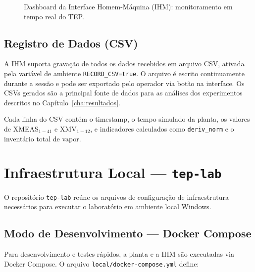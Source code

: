 \begin{figure}[htbp]
\centering
{}
\caption{Dashboard da Interface Homem-Máquina (IHM): monitoramento em tempo real do TEP.}
\label{fig:ihm_dashboard}
\end{figure}

\subsection{Registro de Dados (CSV)}

A IHM suporta gravação de todos os dados recebidos em arquivo CSV, ativada pela variável de ambiente \texttt{RECORD\_CSV=true}. O arquivo é escrito continuamente durante a sessão e pode ser exportado pelo operador via botão na interface. Os CSVs gerados são a principal fonte de dados para as análises dos experimentos descritos no Capítulo~\ref{cha:resultados}.

Cada linha do CSV contém o timestamp, o tempo simulado da planta, os valores de XMEAS$_{1-41}$ e XMV$_{1-12}$, e indicadores calculados como \texttt{deriv\_norm} e o inventário total de vapor.

\section{Infraestrutura Local — \texttt{tep-lab}}
\label{sec:supervisor}

O repositório \texttt{tep-lab} reúne os arquivos de configuração de infraestrutura necessários para executar o laboratório em ambiente local Windows.

\subsection{Modo de Desenvolvimento — Docker Compose}

Para desenvolvimento e testes rápidos, a planta e a IHM são executadas via Docker Compose. O arquivo \texttt{local/docker-compose.yml} define:

